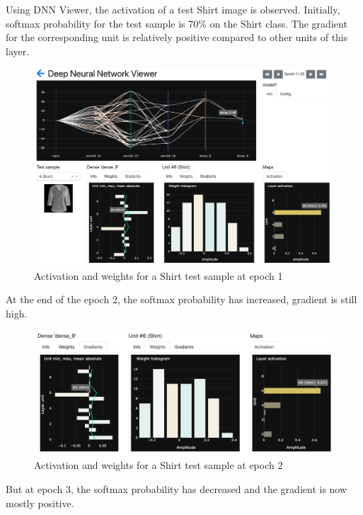 Using DNN Viewer, the activation of a test Shirt image is observed. Initially, softmax probability for the test sample is 70\% on the Shirt class. The gradient for the corresponding unit is relatively positive compared to other units of this layer.

\begin{figure}[H]
    \centering
    \includegraphics[scale=0.3]{images/dnn-viewer/TimeShirt_epoch1.png}
    \caption{Activation and weights for a Shirt test sample at epoch 1}
    \label{fig:dnn-viewer-time-shirt-epoch1}
\end{figure}

At the end of the epoch 2, the softmax probability has increased, gradient is still high.

\begin{figure}[H]
    \centering
    \includegraphics[scale=0.3]{images/dnn-viewer/TimeShirt_epoch3.png}
    \caption{Activation and weights for a Shirt test sample at epoch 2}
    \label{fig:dnn-viewer-time-shirt-epoch2}
\end{figure}

But at epoch 3, the softmax probability has decreased and the gradient is now mostly positive.

